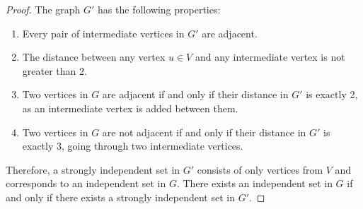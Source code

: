 \documentclass{article}
\begin{document}
\begin{enumerate}[resume]
\begin{proof}
        The graph $G'$ has the following properties:
        \begin{enumerate}
            \item Every pair of intermediate vertices in $G'$ are adjacent.
            \item The distance between any vertex $u \in V$ and any intermediate vertex is not greater than 2.
            \item Two vertices in $G$ are adjacent if and only if their distance in $G'$ is exactly 2, as an intermediate vertex is added between them.
            \item Two vertices in $G$ are not adjacent if and only if their distance in $G'$ is exactly 3, going through two intermediate vertices.
        \end{enumerate}

        Therefore, a strongly independent set in $G'$ consists of only vertices from $V$ and corresponds to an independent set in $G$. There exists an independent set in $G$ if and only if there exists a strongly independent set in $G'$.
    \end{proof}
\end{enumerate}
\end{document}
